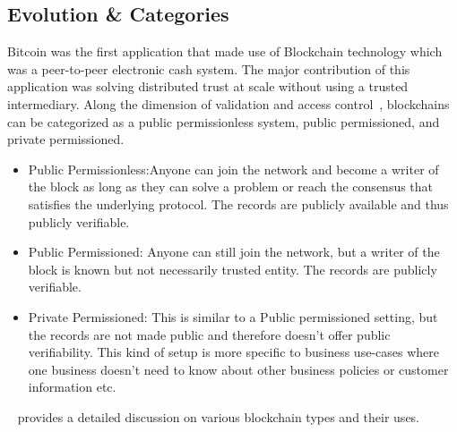 

\subsection{Evolution \& Categories}
Bitcoin was the first application that made use of Blockchain technology which
was a peer-to-peer electronic cash system. The major contribution of this
application was solving distributed trust at scale without using a trusted
intermediary. 
Along the dimension of validation and access control~\cite{voronchenko2017you},
blockchains can be categorized as a public permissionless system, public
permissioned, and private permissioned. 
\begin{itemize}
	\item Public Permissionless:Anyone can join the network and become a writer
		of the block as long as they can solve a problem or reach the consensus
		that satisfies the underlying protocol. The records are publicly
		available and thus publicly verifiable. 
	\item Public Permissioned: Anyone can still join the network, but a writer
		of the block is known but not necessarily trusted entity. The records
		are publicly verifiable. 
	\item Private Permissioned: This is similar to a Public permissioned
		setting, but the records are not made public and therefore doesn't
		offer public verifiability. This kind of setup is more specific to
		business use-cases where one business doesn't need to know about other
		business policies or customer information etc. 
\end{itemize}
~\cite{voronchenko2017you} provides a detailed discussion on various blockchain
types and their uses.


